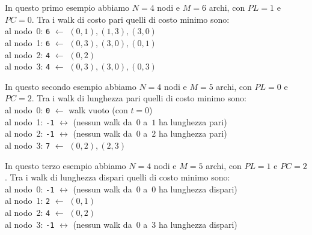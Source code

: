 \vspace{0.5cm}

In questo primo esempio abbiamo $N=4$ nodi e $M=6$ archi, con $PL=1$ e $PC=0$. Tra i walk di costo pari quelli di costo minimo sono:\\
\indent al nodo~0: {\tt 6}  $\leftarrow$ $(0,1),(1,3),(3,0)$\\ 
\indent al nodo~1: {\tt 6}  $\leftarrow$ $(0,3),(3,0),(0,1)$\\ 
\indent al nodo~2: {\tt 4}  $\leftarrow$ $(0,2)$\\ 
\indent al nodo~3: {\tt 4}  $\leftarrow$ $(0,3),(3,0),(0,3)$\\ 

\vspace{0.5cm}

In questo secondo esempio abbiamo $N=4$ nodi e $M=5$ archi, con $PL=0$ e $PC=2$. Tra i walk di lunghezza pari quelli di costo minimo sono:\\
\indent al nodo~0: {\tt 0}  $\leftarrow$ walk vuoto (con $t=0$)\\ 
\indent al nodo~1: {\tt -1}  $\leftrightarrow$ (nessun walk da~$0$ a~$1$ ha lunghezza pari)\\
\indent al nodo~2: {\tt -1}  $\leftrightarrow$ (nessun walk da~$0$ a~$2$ ha lunghezza pari)\\ 
\indent al nodo~3: {\tt 7}  $\leftarrow$ $(0,2),(2,3)$\\ 

\vspace{0.5cm}

In questo terzo esempio abbiamo $N=4$ nodi e $M=5$ archi, con $PL=1$ e $PC=2$. Tra i walk di lunghezza dispari quelli di costo minimo sono:\\
\indent al nodo~0: {\tt -1}  $\leftrightarrow$ (nessun walk da~$0$ a~$0$ ha lunghezza dispari)\\ 
\indent al nodo~1: {\tt 2} $\leftarrow$ $(0,1)$\\ 
\indent al nodo~2: {\tt 4}  $\leftarrow$ $(0,2)$\\ 
\indent al nodo~3: {\tt -1}  $\leftrightarrow$ (nessun walk da~$0$ a~$3$ ha lunghezza dispari)\\ 



